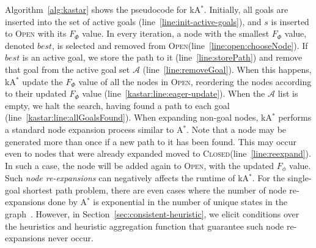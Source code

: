 \documentclass[smallextended]{svjour3}       %
\newcommand{\astar}{A$^*$\xspace}
\newcommand{\kastar}{kA$^*$\xspace}
\newcommand{\open}{\textsc{Open}\xspace}
\newcommand{\closed}{\textsc{Closed}\xspace}
\newcommand{\activeg}{\mathcal{A}}
\newcommand{\vect}[1]{\mathbf{#1}}
\begin{document}
Algorithm~\ref{alg:kastar} shows the pseudocode for \kastar. 
Initially, all goals are inserted into the set of active goals (line~\ref{line:init-active-goals}), and $s$ is inserted to \open with its $F_\Phi$ value. 
In every iteration, a node with the smallest $F_\Phi$ value, denoted $\mathit{best}$, is selected and removed from \open (line~\ref{line:open:chooseNode}). 
If $\mathit{best}$ is an active goal, we store the path to it (line~\ref{line:storePath}) and remove that goal from the active goal set $\activeg$ (line~\ref{line:removeGoal}). 
When this happens, \kastar update the $F_\Phi$ value of all the nodes in \open, reordering the nodes according to their updated $F_\Phi$ value 
 (line~\ref{kastar:line:eager-update}).
When the $\activeg$ list is empty, we halt the search, having found a path to each goal (line~\ref{kastar:line:allGoalsFound}).
When expanding non-goal nodes, \kastar performs a standard node expansion process similar to \astar. 
Note that a node may be generated more than once if a new path to it has been found. This may occur even to nodes that were already expanded moved to \closed (line~\ref{line:reexpand}). In such a case, the node will be added again to \open, with the updated $F_\phi$ value. 
Such \emph{node re-expansions} can negatively affects the runtime of \kastar. For the single-goal shortest path problem, there are even cases where the number of node re-expansions done by \astar is exponential in the number of unique states in the graph~\cite{martelli1977complexity}. %
However, in Section~\ref{sec:consistent-heuristic}, we elicit conditions over the heuristics and heuristic aggregation function that guarantee such node re-expansions never occur. 
\end{document}
